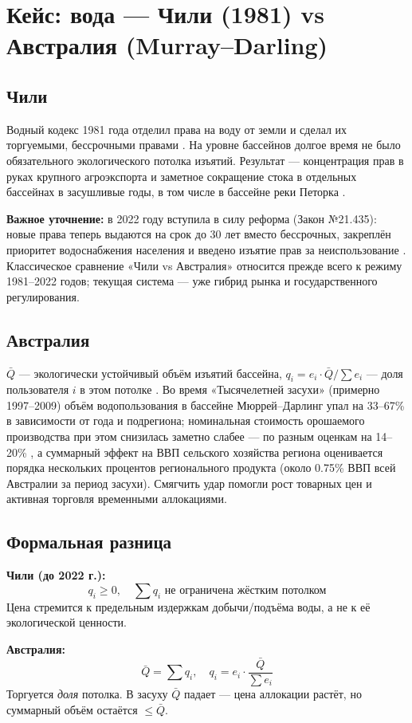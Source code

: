 \documentclass[11pt]{article}
\begin{document}
\section{Кейс: вода — Чили (1981) vs Австралия (Murray--Darling)}

\subsection{Чили}
Водный кодекс 1981 года отделил права на воду от земли и сделал их торгуемыми, бессрочными правами \cite{bauer1998chile}. На уровне бассейнов долгое время не было обязательного экологического потолка изъятий. Результат — концентрация прав в руках крупного агроэкспорта и заметное сокращение стока в отдельных бассейнах в засушливые годы, в том числе в бассейне реки Петорка \cite{budds2008chapter}.

\textbf{Важное уточнение:} в 2022 году вступила в силу реформа (Закон №21.435): новые права теперь выдаются на срок до 30 лет вместо бессрочных, закреплён приоритет водоснабжения населения и введено изъятие прав за неиспользование \cite{chile2022reform}. Классическое сравнение «Чили vs Австралия» относится прежде всего к режиму 1981--2022 годов; текущая система — уже гибрид рынка и государственного регулирования.

\subsection{Австралия}
$\bar{Q}$ — экологически устойчивый объём изъятий бассейна, $q_i = e_i \cdot \bar{Q}/\sum e_i$ — доля пользователя $i$ в этом потолке \cite{grafton2014water}. Во время «Тысячелетней засухи» (примерно 1997--2009) объём водопользования в бассейне Мюррей--Дарлинг упал на 33--67\% в зависимости от года и подрегиона; номинальная стоимость орошаемого производства при этом снизилась заметно слабее — по разным оценкам на 14--20\% \cite{kirby2014drought}, а суммарный эффект на ВВП сельского хозяйства региона оценивается порядка нескольких процентов регионального продукта (около 0.75\% ВВП всей Австралии за период засухи). Смягчить удар помогли рост товарных цен и активная торговля временными аллокациями.

\subsection{Формальная разница}
\noindent
\begin{minipage}[t]{0.45\textwidth}
\textbf{Чили (до 2022 г.):}
\[
q_i \ge 0,\quad \sum q_i \text{ не ограничена жёстким потолком}
\]
Цена стремится к предельным издержкам добычи/подъёма воды, а не к её экологической ценности.
\end{minipage}\hfill
\begin{minipage}[t]{0.45\textwidth}
\textbf{Австралия:}
\[
\bar{Q} = \sum q_i,\quad q_i = e_i \cdot \frac{\bar{Q}}{\sum e_i}
\]
Торгуется \emph{доля} потолка. В засуху $\bar{Q}$ падает — цена аллокации растёт, но суммарный объём остаётся $\le \bar{Q}$.
\end{minipage}
\end{document}
